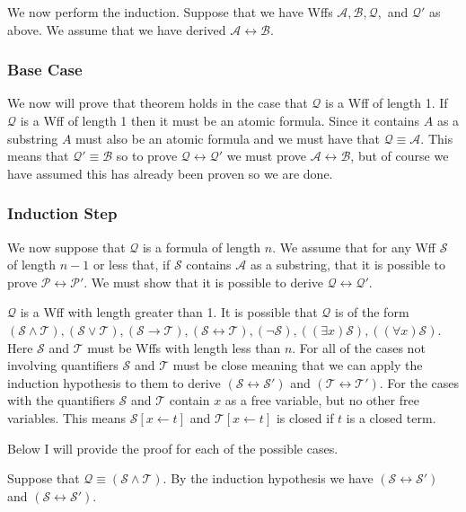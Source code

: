 \documentclass[12pt]{article}
\newcommand{\mc}[1]{\mathcal{#1}}
\begin{document}
We now perform the induction. Suppose that we have Wffs $\mc{A}, \mc{B}, \mc{Q},$ and $\mc{Q}'$ as above. We assume that we have derived $\mc{A} \leftrightarrow \mc{B}$. 

\subsubsection*{Base Case}
We now will prove that theorem holds in the case that $\mc{Q}$ is a Wff of length 1. If $\mc{Q}$ is a Wff of length 1 then it must be an atomic formula. Since it contains $A$ as a substring $A$ must also be an atomic formula and we must have that $\mc{Q} \equiv \mc{A}$. This means that $\mc{Q}' \equiv \mc{B}$ so to prove $\mc{Q} \leftrightarrow \mc{Q}'$ we must prove $\mc{A} \leftrightarrow \mc{B}$, but of course we have assumed this has already been proven so we are done.

\subsubsection*{Induction Step}
We now suppose that $\mc{Q}$ is a formula of length $n$. We assume that for any Wff $\mc{S}$ of length $n-1$ or less that, if $\mc{S}$ contains $\mc{A}$ as a substring, that it is possible to prove $\mc{P} \leftrightarrow \mc{P}'$. We must show that it is possible to derive $\mc{Q} \leftrightarrow \mc{Q}'$.

$\mc{Q}$ is a Wff with length greater than 1. It is possible that $\mc{Q}$ is of the form $(\mc{S} \land \mc{T}), (\mc{S} \lor \mc{T}), (\mc{S} \rightarrow \mc{T}), (\mc{S} \leftrightarrow \mc{T}), (\lnot \mc{S}), ((\exists x)\mc{S}), ((\forall x)\mc{S})$. Here $\mc{S}$ and $\mc{T}$ must be Wffs with length less than $n$. For all of the cases not involving quantifiers $\mc{S}$ and $\mc{T}$ must be close meaning that we can apply the induction hypothesis to them to derive $(\mc{S} \leftrightarrow \mc{S}')$ and $(\mc{T} \leftrightarrow \mc{T}')$. For the cases with the quantifiers $\mc{S}$ and $\mc{T}$ contain $x$ as a free variable, but no other free variables. This means $\mc{S}[x\leftarrow t]$ and $\mc{T}[x\leftarrow t]$ is closed if $t$ is a closed term.

Below I will provide the proof for each of the possible cases.

\hrulefill

Suppose that $\mc{Q} \equiv (\mc{S} \land \mc{T})$. By the induction hypothesis we have $(\mc{S} \leftrightarrow \mc{S}')$ and $(\mc{S} \leftrightarrow \mc{S}')$.
\end{document}
